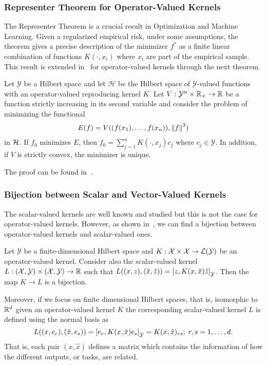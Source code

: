 \subsubsection*{Representer Theorem for Operator-Valued Kernels}
The Representer Theorem is a crucial result in Optimization and Machine Learning. Given a regularized empirical risk, under some assumptions, the theorem gives a precise description of the minimizer $f^*$ as a finite linear combination of functions $K(\cdot, x_i)$ where $x_i$ are part of the empirical sample.
This result is extended in~\citet[Theorem 4.2]{MicchelliP05} for operator-valued kernels through the next theorem.
\begin{theorem}
    Let $\mathcal{Y}$ be a Hilbert space and let $\mathcal{H}$ be the Hilbert space of $\mathcal{Y}$-valued functions with an operator-valued reproducing kernel $K$. Let $V: \mathcal{Y}^n \times \mathbb{R}_+ \to \mathbb{R}$ be a function strictly increasing in its second variable and consider the problem of minimizing the functional    
    \begin{equation}\label{eq:representer_functional}
        \begin{aligned}
            E(f) = V((f(x_1), \ldots, f(x_n)), \norm{f}^2)
        \end{aligned}
    \end{equation}
    in $\mathcal{H}$.
    If
    $f_0$ minimizes $E$, then $f_0 = \sum_{j=1}^n K(\cdot, x_j) c_j$ where $c_j \in \mathcal{Y}$. In addition, if $V$ is strictly convex, the minimizer is unique. 
\end{theorem}
The proof can be found in~\citet{MicchelliP05}.

\subsubsection*{Bijection between Scalar and Vector-Valued Kernels}
The scalar-valued kernels are well known and studied but this is not the case for operator-valued kernels. However, as shown in~\cite{Hein04kernels,BaldassarreRBV12}, we can find a bijection between operator-valued kernels and scalar-valued ones.
\begin{lemma}\label{lemma:kernel_bijection}
    Let $\mathcal{Y}$ be a finite-dimensional Hilbert space and
    $K: \mathcal{X} \times \mathcal{X} \to \mathcal{L}(\mathcal{Y})$
    be an operator-valued kernel. Consider also the scalar-valued kernel
    $L: (\mathcal{X}, \mathcal{Y}) \times (\mathcal{X}, \mathcal{Y}) \to \mathbb{R}$
    such that $L((x, z), (\hat{x}, \hat{z})) = \left[ z, K(x, \hat{x}) \hat{z} \right]_\mathcal{Y}$. Then the map $K \to L$ is a bijection.
\end{lemma}
Moreover, if we focus on finite dimensional Hilbert spaces, that is, isomorphic to $\mathbb{R}^d$ given an operator-valued kernel $K$ the corresponding scalar-valued kernel $L$ is defined using the normal basis as
$$ L((x, e_r), (\hat{x}, e_s)) = \left[ e_r, K(x, \hat{x}) e_s \right]_\mathcal{Y} = K(x, \hat{x})_{rs} ; \; r,s=1, \ldots, d.$$
That is, each pair $(x, \hat{x})$ defines a matrix which contains the information of how the different outputs, or tasks, are related.
 
